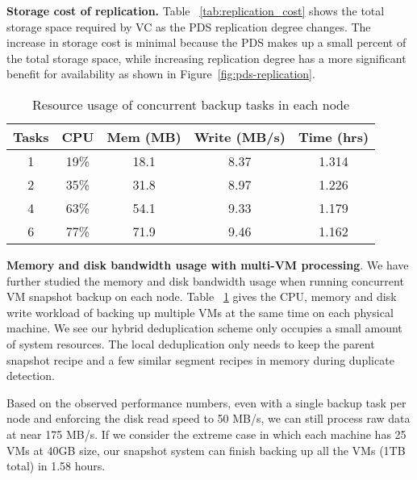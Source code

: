 {\bf Storage cost of replication.} Table ~\ref{tab:replication_cost} shows the total storage space required by 
VC as the PDS replication degree changes. The increase in storage cost is minimal because the PDS makes up a 
small percent of the total storage space, while increasing replication degree has a  more significant benefit for
availability as shown in Figure~\ref{fig:pds-replication}.

\begin{table}
    \begin{tabular}{|c|c|c|c|c|}
    \hline
    Tasks & CPU & Mem (MB) & Write (MB/s) & Time (hrs) \\ \hline
    1     & 19\% & 18.1 & 8.37 & 1.314\\ \hline
    2     & 35\% & 31.8 & 8.97 & 1.226\\ \hline
    4     & 63\% & 54.1 & 9.33 & 1.179\\ \hline
    6     & 77\% & 71.9 & 9.46 & 1.162\\ \hline
    \end{tabular}
\caption{Resource usage of concurrent backup tasks in each node}
\label{tab:resource_usage}
\end{table}

{\bf Memory and disk bandwidth usage with multi-VM processing}. 
We have further studied the memory and disk bandwidth usage 
when running concurrent VM snapshot backup on each node. 
Table ~\ref{tab:resource_usage} gives the CPU, memory and disk write workload of backing up multiple VMs 
at the same time on each physical machine. 
We see our hybrid deduplication scheme only occupies a small amount of system resources. 
The  local deduplication only needs to keep the parent snapshot recipe and a few similar segment recipes in 
memory during duplicate detection.

Based on the observed performance numbers, even with a single backup task per node and enforcing the disk read speed to
50 MB/s,  we can still process raw data at near 175 MB/s. If we consider the extreme case in which each machine has 25 VMs
at 40GB size, our snapshot system can finish backing up all the VMs (1TB total) in 1.58 hours.

